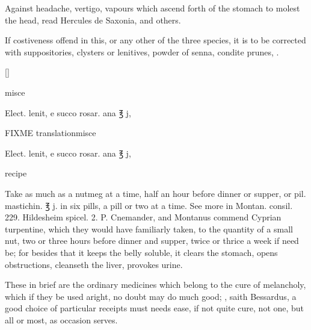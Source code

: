 Against headache, vertigo, vapours which ascend forth of the stomach to
molest the head, read Hercules de Saxonia, and others.

If costiveness offend in this, or any other of the three species, it is
to be corrected with suppositories, clysters or lenitives, powder of
senna, condite prunes, \etc{}.

\begin{Prescription}[H]
[\baselineskip]
\begin{prescriptionbox}{}{\textlatin{misce}}
\item \textlatin{Elect. lenit, e succo rosar. ana ℥ j},
\end{prescriptionbox}
\begin{prescriptionbox}{FIXME translation}{\textlatin{misce}}
\item \textlatin{Elect. lenit, e succo rosar. ana ℥ j},
\end{prescriptionbox}
\caption{ recipe}
\end{Prescription}

Take as much as a nutmeg at a time, half an hour before dinner
or supper, or pil. mastichin. ℥ j. in six pills, a pill or two at a
time. See more in Montan. consil. 229. Hildesheim spicel. 2. P.
Cnemander, and Montanus commend Cyprian turpentine, which they
would have familiarly taken, to the quantity of a small nut, two or
three hours before dinner and supper, twice or thrice a week if need
be; for besides that it keeps the belly soluble, it clears the stomach,
opens obstructions, cleanseth the liver, provokes urine.

These in brief are the ordinary medicines which belong to the cure of
melancholy, which if they be used aright, no doubt may do much good; , saith
Bessardus, a good choice of particular receipts must needs ease, if not
quite cure, not one, but all or most, as occasion serves. 
